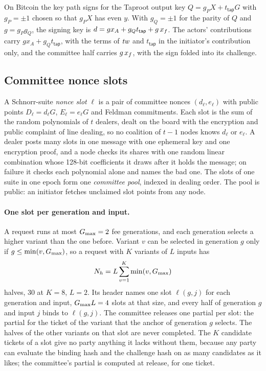 On Bitcoin the key path signs for the Taproot output key $Q = g_P X + t_{\mathsf{tap}} G$ with $g_P = \pm 1$ chosen so that $g_P X$ has even $y$. With $g_Q = \pm 1$ for the parity of $Q$ and $g = g_P g_Q$, the signing key is $d = g x_A + g_Q t_{\mathsf{tap}} + g\,x_{f}$. The actors' contributions carry $g x_A + g_Q t_{\mathsf{tap}}$, with the terms of $\mathit{tw}$ and $t_{\mathsf{tap}}$ in the initiator's contribution only, and the committee half carries $g\,x_{f}$, with the sign folded into its challenge.

\subsection{Committee nonce slots}\label{sec:slots}

A Schnorr-suite \emph{nonce slot} $\ell$ is a pair of committee nonces $(d_\ell, e_\ell)$ with public points $D_\ell = d_\ell G$, $E_\ell = e_\ell G$ and Feldman commitments. Each slot is the sum of the random polynomials of $t$ dealers, dealt on the board with the encryption and public complaint of line dealing, so no coalition of $t-1$ nodes knows $d_\ell$ or $e_\ell$. A dealer posts many slots in one message with one ephemeral key and one encryption proof, and a node checks its shares with one random linear combination whose 128-bit coefficients it draws after it holds the message; on failure it checks each polynomial alone and names the bad one. The slots of one suite in one epoch form one \emph{committee pool}, indexed in dealing order. The pool is public: an initiator fetches unclaimed slot points from any node.

\paragraph{One slot per generation and input.} A request runs at most $G_{\max} = 2$ fee generations, and each generation selects a higher variant than the one before. Variant $v$ can be selected in generation $g$ only if $g \le \min(v, G_{\max})$, so a request with $K$ variants of $L$ inputs has
\[
  N_{h} = L \sum_{v=1}^{K} \min(v, G_{\max})
\]
halves, 30 at $K = 8$, $L = 2$. Its header names one slot $\ell(g, j)$ for each generation and input, $G_{\max} L = 4$ slots at that size, and every half of generation $g$ and input $j$ binds to $\ell(g, j)$. The committee releases one partial per slot: the partial for the ticket of the variant that the anchor of generation $g$ selects. The halves of the other variants on that slot are never completed. The $K$ candidate tickets of a slot give no party anything it lacks without them, because any party can evaluate the binding hash and the challenge hash on as many candidates as it likes; the committee's partial is computed at release, for one ticket.

